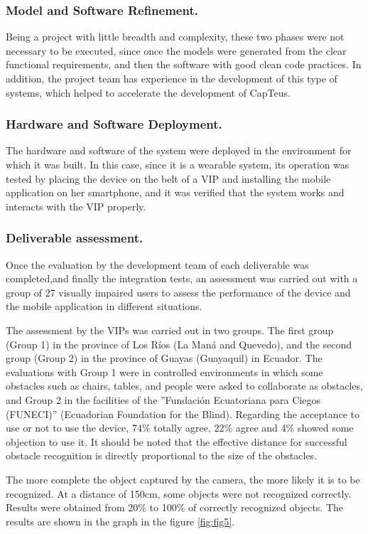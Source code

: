 \documentclass{svproc}
\begin{document}
\subsubsection{Model and Software Refinement.}
Being a project with little breadth and complexity, these two phases were not
necessary to be executed, since once the models were generated from the clear
functional requirements, and then the software with good clean code practices.
In addition, the project team has experience in the development of this type of
systems, which helped to accelerate the development of CapTeus.

\subsubsection{Hardware and Software Deployment.}
The hardware and software of the system were deployed in the environment
for which it was built. In this case, since it is a wearable system, its operation
was tested by placing the device on the belt of a VIP and installing the mobile
application on her smartphone, and it was verified that the system works and
interacts with the VIP properly.

\subsubsection{Deliverable assessment.} Once the evaluation by the development team of each deliverable was completed,and finally the integration tests, an assessment was carried out with a group of 27 visually impaired users to assess the performance of the device and the mobile
application in different situations.

The assessment by the VIPs was carried out in two groups. The first group (Group 1) in the province of Los R\'{i}os (La Man\'{a} and Quevedo), and the second
group (Group 2) in the province of Guayas (Guayaquil) in Ecuador. The evaluations
with Group 1 were in controlled environments in which some obstacles
such as chairs, tables, and people were asked to collaborate as obstacles, and
Group 2 in the facilities of the ”Fundaci\'{o}n Ecuatoriana para Ciegos (FUNECI)”
(Ecuadorian Foundation for the Blind). Regarding the acceptance to use or not
to use the device, 74\% totally agree, 22\% agree and 4\% showed some objection
to use it. It should be noted that the effective distance for successful obstacle
recognition is directly proportional to the size of the obstacles.

The more complete the object captured by the camera, the more likely it
is to be recognized. At a distance of 150cm, some objects were not recognized
correctly. Results were obtained from 20\% to 100\% of correctly recognized objects.
The results are shown in the graph in the figure \ref{fig:fig5}.
\end{document}
